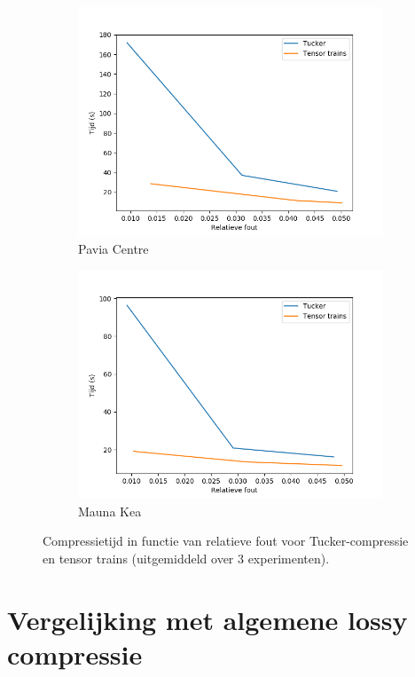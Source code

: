 \begin{figure}[]
\begin{subfigure}{0.48\textwidth}
  \includegraphics[width=\linewidth]{images/tucker_vs_tensor_trains_times_Pavia_Centre.png}
  \caption{Pavia Centre}
\end{subfigure}
\begin{subfigure}{0.48\textwidth}
  \centering
  \includegraphics[width=\linewidth]{images/tucker_vs_tensor_trains_times_Mauna_Kea.png}
  \caption{Mauna Kea}
\end{subfigure}
\caption{Compressietijd in functie van relatieve fout voor Tucker-compressie en tensor trains (uitgemiddeld over 3 experimenten).}
\label{fig:tucker-vs-tensor-trains-times}
\end{figure}

\section{Vergelijking met algemene lossy compressie}


